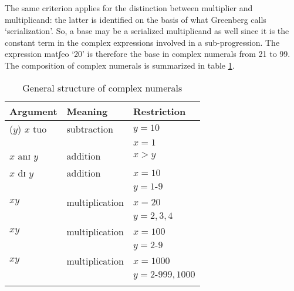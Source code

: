 \begin{exe}
\begin{exe}
\begin{exe}
{\begin{exe}
\begin{exe}
\begin{exe}
\begin{exe}
\begin{exe}
\begin{exe}
\begin{exe}
\begin{exe}
\begin{exe}
The same criterion applies for the distinction between multiplier and
multiplicand: the latter  is identified on the basis of what Greenberg calls
`serialization'. So, a  base may be   a serialized multiplicand as well since it
is the constant term in the complex expressions involved in a sub-progression.
The expression  {\sls matʃeo} `20' is therefore the base in complex numerals  
from 21
to 99. The composition of complex numerals is summarized in table
\ref{tab:threecompo}.


\begin{table}[h]
\caption{General structure of complex numerals  \label{tab:threecompo}}
  \centering

\begin{tabular}{lll}
\lsptoprule
  Argument & Meaning & Restriction\\
\midrule
 ($y$)   $x$   tuo  & subtraction  &$y={10}$\\
&& $x={1}$\\ 
   $x$ anɪ $y$ & addition  &$x>y$\\
$x$ dɪ $y$  & addition &$x={10}$\\
&& $y={1 \textrm{-}9}$\\ %

$x y$ & multiplication &$x=20$\\
&& $y={2,3,4}$\\ %
$x y$  & multiplication  &$x={100}$\\
&& $y={2 \textrm{-}9}$\\ %
$x y$  & multiplication  &$x={1000}$\\
&& $y={2 \textrm{-}999, 1000}$\\ %
\lspbottomrule
\end{tabular}
\end{table}



\end{exe}
\end{exe}
\end{exe}
\end{exe}
\end{exe}
\end{exe}
\end{exe}
\end{exe}
\end{exe}}
\end{exe}
\end{exe}
\end{exe}
